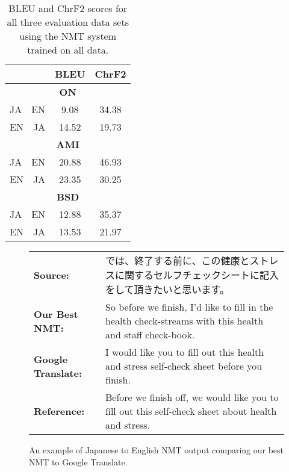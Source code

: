 \documentclass[11pt,a4paper]{article}
\newcommand*{\enja}{EN~~JA}
\newcommand*{\jaen}{JA~~EN}
\begin{document}
\begin{table}[t]
\begin{small}
    \centering
    \begin{tabular}{|l|c|c|}
    \hline
          & BLEU    & ChrF2 \\ \hline
          \multicolumn{3}{|c|}{\bf ON} \\ \hline
    \jaen & 9.08    & 34.38 \\ \hline
    \enja & 14.52   & 19.73 \\ \hline
          \multicolumn{3}{|c|}{\bf AMI} \\ \hline
    \jaen & 20.88   & 46.93 \\ \hline
    \enja & 23.35   & 30.25 \\ \hline
          \multicolumn{3}{|c|}{\bf BSD} \\ \hline
    \jaen & 12.88   & 35.37 \\ \hline
    \enja & 13.53   & 21.97 \\ \hline
    \end{tabular}
    \caption{BLEU and ChrF2 scores for all three evaluation data sets using the NMT system trained on all data.}
    \label{tab:nmt-result-table}
    \end{small}
\end{table}

\begin{CJK}{UTF8}{min}
\begin{figure*}[t]
\begin{small}
  \begin{tabular}{lp{12cm}}
   \bf Source: & では、終了する前に、この健康とストレスに関するセルフチェックシートに記入をして頂きたいと思います。 \\
   \bf Our Best NMT: & So before we finish, I'd like to fill in the health check-streams with this health and staff check-book.\\
   \bf Google Translate: & I would like you to fill out this health and stress self-check sheet before you finish.\\
   \bf Reference: & Before we finish off, we would like you to fill out this self-check sheet about health and stress. \\
  \end{tabular}
  \caption{An example of Japanese to English NMT output comparing our best NMT to Google Translate.}
  \label{fig:nmt-output-example}
\end{small}
\end{figure*}
\end{CJK}
\end{document}
